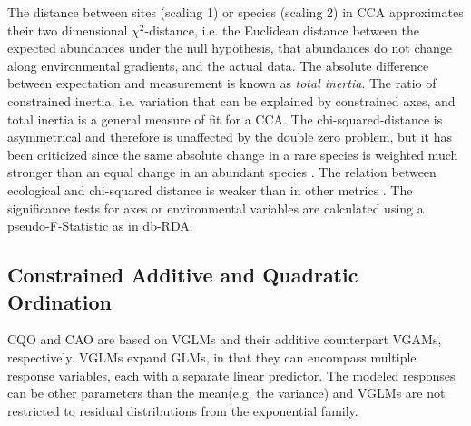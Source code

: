 		The distance between sites (scaling 1) or species (scaling 2) in CCA approximates their two dimensional $\chi^2$-distance, i.e. the Euclidean distance between the expected abundances under the null hypothesis, that abundances do not change along environmental gradients, and the actual data.
		The absolute difference between expectation and measurement is known as \textit{total inertia}. 
		The ratio of constrained inertia, i.e. variation that can be explained by constrained axes, and total inertia is a general measure of fit for a CCA.
		The chi-squared-distance is asymmetrical and therefore is unaffected by the double zero problem, but it has been criticized since the same absolute change in a rare species is weighted much stronger than an equal change in an abundant species \citep{greig1983quantitative}. 
		The relation between ecological and chi-squared distance is weaker than in other metrics \citep{faith1987compositional,Legendre2001}.
		The significance tests for axes or environmental variables are calculated using a pseudo-F-Statistic as in db-RDA.
	
	\subsection{Constrained Additive and Quadratic Ordination}

		CQO and CAO are based on VGLMs and their additive counterpart VGAMs, respectively. 
		VGLMs expand GLMs, in that they can encompass multiple response variables, each with a separate linear predictor. 
		The modeled responses can be other parameters than the mean(e.g. the variance) and
		VGLMs are not restricted to residual distributions from the exponential family. \\
		
